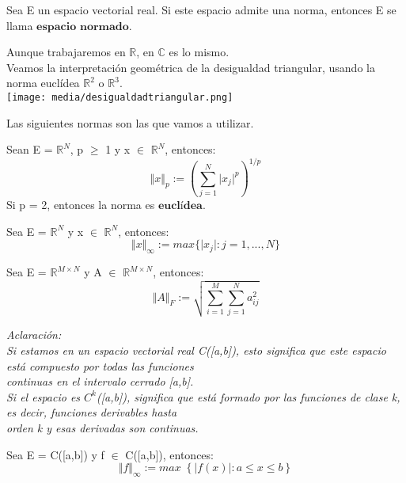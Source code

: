 \begin{ndef}
Sea E un espacio vectorial real. Si este espacio admite una norma, entonces E se llama $\textbf{espacio normado}$.
\end{ndef}

Aunque trabajaremos en $\mathbb{R}$, en $\mathbb{C}$ es lo mismo.\\
Veamos la interpretación geométrica de la desigualdad triangular, usando la norma euclídea $\mathbb{R}^2$ o $\mathbb{R}^3$.\\
\texttt{[image: media/desigualdadtriangular.png]}

Las siguientes normas son las que vamos a utilizar.

\begin{ndef}[Norma p]
Sean E = $\mathbb{R}^N$, p $\geq$ 1 y x $\in$ $\mathbb{R}^N$, entonces:
\[ \Vert x \Vert _{p} := \left( \sum_{j=1}^{N} \vert x_{j} \vert ^p \right) ^{1/p} \]
Si p = 2, entonces la norma es $\textbf{euclídea}$.
\end{ndef}

\begin{ndef}
Sea E = $\mathbb{R}^N$ y x $\in$ $\mathbb{R}^N$, entonces:
\[ \Vert x \Vert _{\infty} := max \lbrace \vert x_{j} \vert : j = 1,...,N \rbrace \]
\end{ndef}

\begin{ndef}
Sea E = $\mathbb{R}^{M \times N}$ y A $\in$ $\mathbb{R}^{M \times N}$, entonces:
\[ \Vert A \Vert _F := \sqrt{\sum_{i=1}^{M} \sum_{j=1}^{N} a_{ij}^2} \]
\end{ndef}

\textit{Aclaración:}\\
\textit{Si estamos en un espacio vectorial real C([a,b]), esto significa que este espacio está compuesto por todas las funciones}\\
\textit{continuas en el intervalo cerrado [a,b].}\\
\textit{Si el espacio es $C^k$([a,b]), significa que está formado por las funciones de clase k, es decir, funciones derivables hasta}\\
\textit{orden k y esas derivadas son continuas.}

\begin{ndef}
Sea E = C([a,b]) y f $\in$ C([a,b]), entonces:
\[ \Vert f \Vert _\infty := max \; \left\lbrace \vert f(x) \vert : a \leq x \leq b \right\rbrace \]
\end{ndef}

